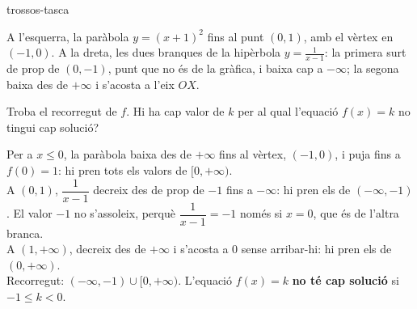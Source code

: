 \begin{apartats}
\begin{tria}{trossos-tasca}
\begin{solucio}
A l'esquerra, la paràbola $y=(x+1)^2$ fins al punt $(0,1)$, amb el vèrtex en $(-1,0)$. A la dreta,
les dues branques de la hipèrbola $y=\frac{1}{x-1}$: la primera surt de prop de $(0,-1)$, punt que no
és de la gràfica, i baixa cap a $-\infty$; la segona baixa des de $+\infty$ i s'acosta a l'eix $OX$.
\begin{center}
\end{center}
\end{solucio}

Troba el recorregut de $f$. Hi ha cap valor de $k$ per al qual l'equació $f(x)=k$ no tingui cap
solució?

\begin{solucio}
Per a $x\le0$, la paràbola baixa des de $+\infty$ fins al vèrtex, $(-1,0)$, i puja fins a $f(0)=1$:
hi pren tots els valors de $[0,+\infty)$.\\
A $(0,1)$, $\dfrac{1}{x-1}$ decreix des de prop de $-1$ fins a $-\infty$: hi pren els de
$(-\infty,-1)$. El valor $-1$ no s'assoleix, perquè $\dfrac{1}{x-1}=-1$ només si $x=0$, que és de
l'altra branca.\\
A $(1,+\infty)$, decreix des de $+\infty$ i s'acosta a $0$ sense arribar-hi: hi pren els de
$(0,+\infty)$.\\
Recorregut: $(-\infty,-1)\cup[0,+\infty)$. L'equació $f(x)=k$ \textbf{no té cap solució} si
$-1\le k<0$.
\end{solucio}
\end{tria}

\end{apartats}
